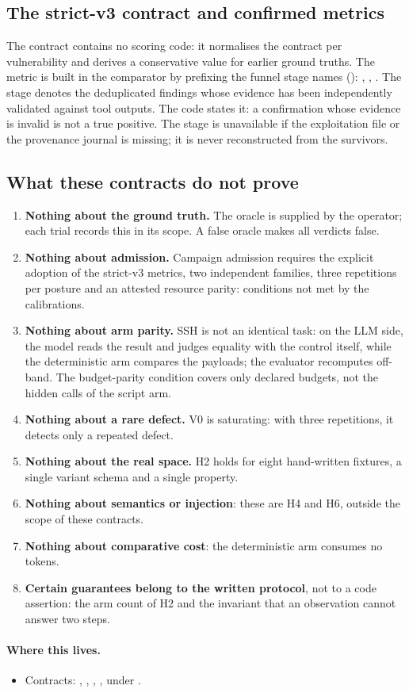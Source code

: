 \subsection{The strict-v3 contract and confirmed metrics}

The contract  contains no scoring code: it
normalises the contract per vulnerability and derives a conservative value for
earlier ground truths. The  metric is built in the comparator by
prefixing the funnel stage names ():
, , . The  stage
denotes the deduplicated findings whose evidence has been independently validated
against tool outputs. The code states it: a confirmation whose evidence is invalid
is not a true positive. The stage is unavailable if the exploitation file or the
provenance journal is missing; it is never reconstructed from the survivors.

\subsection{What these contracts do not prove}

\begin{enumerate}
\item \textbf{Nothing about the ground truth.} The oracle is supplied by the
operator; each trial records this in its scope. A false oracle makes all verdicts
false.
\item \textbf{Nothing about admission.} Campaign admission requires the explicit
adoption of the strict-v3 metrics, two independent families, three repetitions
per posture and an attested resource parity: conditions not met by the
calibrations.
\item \textbf{Nothing about arm parity.} SSH is not an identical task: on the LLM
side, the model reads the result and judges equality with the control itself,
while the deterministic arm compares the payloads; the evaluator recomputes
off-band. The budget-parity condition covers only declared budgets, not the
hidden calls of the script arm.
\item \textbf{Nothing about a rare defect.} V0 is saturating: with three
repetitions, it detects only a repeated defect.
\item \textbf{Nothing about the real space.} H2 holds for eight hand-written
fixtures, a single variant schema and a single property.
\item \textbf{Nothing about semantics or injection}: these are H4 and H6, outside
the scope of these contracts.
\item \textbf{Nothing about comparative cost}: the deterministic arm consumes no
tokens.
\item \textbf{Certain guarantees belong to the written protocol}, not to a code
assertion: the arm count of H2 and the invariant that an observation cannot answer
two steps.
\end{enumerate}

\paragraph{Where this lives.}
\begin{itemize}
\item Contracts: , , , ,  under .
\end{itemize}
